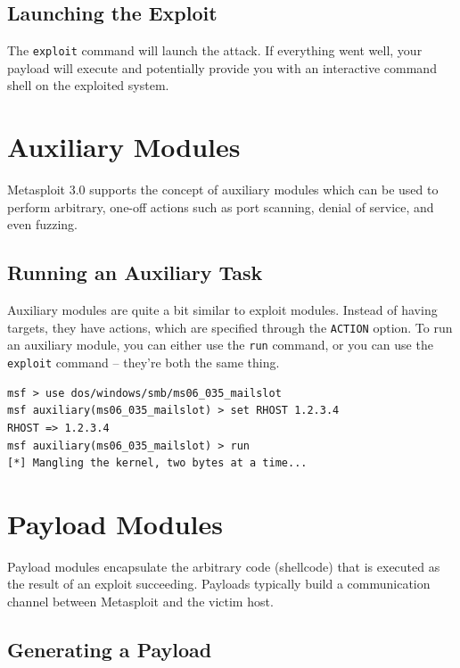 \documentclass{report}
\begin{document}
		\subsection{Launching the Exploit}

\par
The \texttt{exploit} command will launch the attack. If everything went well,
your payload will execute and potentially provide you with an interactive
command shell on the exploited system.

	\section{Auxiliary Modules}

\par
Metasploit 3.0 supports the concept of auxiliary modules which can be used to
perform arbitrary, one-off actions such as port scanning, denial of service, and
even fuzzing.
	
		\subsection{Running an Auxiliary Task}

\par
Auxiliary modules are quite a bit similar to exploit modules. Instead of having
targets, they have actions, which are specified through the \texttt{ACTION}
option. To run an auxiliary module, you can either use the \texttt{run} command,
or you can use the \texttt{exploit} command -- they're both the same thing.

\begin{verbatim}
msf > use dos/windows/smb/ms06_035_mailslot
msf auxiliary(ms06_035_mailslot) > set RHOST 1.2.3.4
RHOST => 1.2.3.4
msf auxiliary(ms06_035_mailslot) > run
[*] Mangling the kernel, two bytes at a time...
\end{verbatim}

	\section{Payload Modules}

\par
Payload modules encapsulate the arbitrary code (shellcode) that is executed as
the result of an exploit succeeding. Payloads typically build a communication
channel between Metasploit and the victim host.

		\subsection{Generating a Payload}
\end{document}
